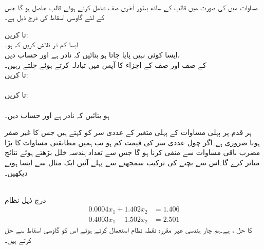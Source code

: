\noindent\makebox[\linewidth]{\rule{\textwidth}{0.4pt}}
\\
مساوات  میں  کی صورت میں  قالب  کے ساتھ بطور آخری صف  شامل کرتے ہوئے  قالب  حاصل ہو گا جس کے لئے گاوسی اسقاط کی  درج ذیل ہے۔

 تا    کریں:\\
ایسا کم تر  تلاش کریں کہ  ہو۔\\
 ایسا کوئی  نہیں پایا جاتا ہو  بتائیں کہ  نادر ہے اور حساب  دیں،\\
  کے صف  اور صف  کے اجزاء کا آپس میں تبادلہ  کرتے ہوئے چلتے رہیں۔\\
 تا   کریں:\\
\\
 تا   کریں:\\
\\
  ہو  بتائیں کہ  نادر ہے اور حساب  دیں۔\\
\noindent\makebox[\linewidth]{\rule{\textwidth}{0.4pt}}

ہر قدم پر پہلی مساوات کے پہلی متغیر کے عددی سر کو  کہتے ہیں جس کا غیر صفر ہونا ضروری ہے۔اگر چول عددی سر کی قیمت کم ہو تب ہمیں مطابقتی مساوات کا بڑا مضرب باقی مساوات سے منفی کرنا ہو گا جس سے  تعداد ہندسہ خلل بڑھتے ہوئے  نتائج متاثر کرے گا۔اس سے بچنے کی ترکیب سمجھنے سے پہلے آئیں ایک مثال سے ایسا ہوتے دیکھیں۔

\quad {}\\
درج ذیل نظام 
\begin{align*}
0.0004x_1+1.402x_2&=1.406\\
0.4003x_1-1.502x_2&=2.501
\end{align*}
کا حل ،  ہے۔ہم چار ہندسی غیر مقررہ نقطہ نظام استعمال کرتے ہوئے اس کو گاوسی اسقاط سے حل کرتے ہیں۔

